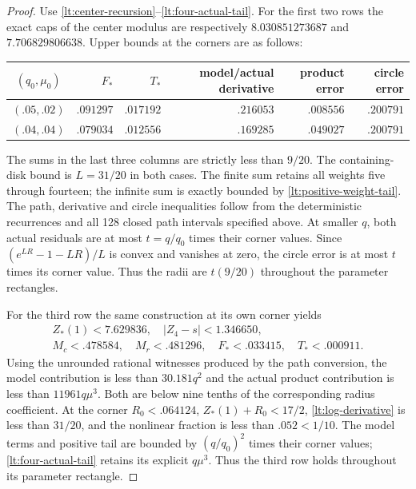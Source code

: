 \begin{proof}
Use \eqref{lt:center-recursion}--\eqref{lt:four-actual-tail}. For the
first two rows the exact caps of the center modulus are respectively
$8.030851273687$ and $7.706829806638$. Upper bounds at
the corners are as follows:
\begin{center}\small
\begin{tabular}{c|rrrrr}
\toprule
$(q_0,\mu_0)$&$F_*$&$T_*$&model/actual derivative&product error&circle error\\\midrule
$(.05,.02)$&$.091297$&$.017192$&$.216053$&$.008556$&$.200791$\\
$(.04,.04)$&$.079034$&$.012556$&$.169285$&$.049027$&$.200791$\\\bottomrule
\end{tabular}
\end{center}
The sums in the last three columns are strictly less than $9/20$.
The containing-disk bound is $L=31/20$ in both cases.
The finite sum retains all weights five through fourteen; the
infinite sum is exactly bounded by \eqref{lt:positive-weight-tail}.
The path, derivative and circle inequalities follow from
the deterministic recurrences and all 128 closed path intervals
specified above. At smaller $q$, both actual residuals are at most
$t=q/q_0$ times their corner values. Since
$(e^{LR}-1-LR)/L$ is convex and vanishes at zero, the circle error
is at most $t$ times its corner value. Thus the radii are $t(9/20)$
throughout the parameter rectangles.

For the third row the same construction at its own corner yields
\begin{gather*}
 Z_*(1)<7.629836,\quad |Z_4-s|<1.346650,\\
 M_c<.478584,\quad M_r<.481296,\quad
 F_*<.033415,\quad T_*<.000911.
\end{gather*}
Using the unrounded rational witnesses produced by the path conversion,
the model contribution is less than $30.181q^2$ and the actual
product contribution is less than $11961q\mu^3$.
Both are below nine tenths of the corresponding radius coefficient.
At the corner $R_0<.064124$, $Z_*(1)+R_0<17/2$,
\eqref{lt:log-derivative} is less than $31/20$, and the nonlinear
fraction is less than $.052<1/10$. The model terms and positive tail
are bounded by $(q/q_0)^2$ times their corner values;
\eqref{lt:four-actual-tail} retains its explicit $q\mu^3$.
Thus the third row holds throughout its parameter rectangle.


\end{proof}
